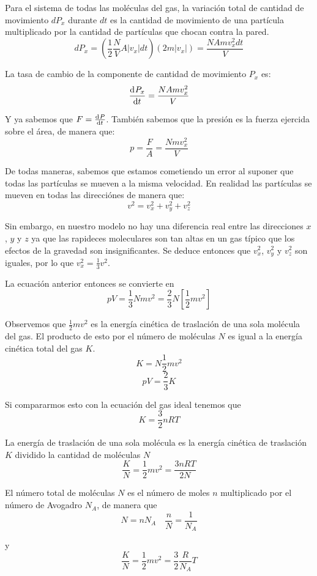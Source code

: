 \documentclass[12pt]{article}
\begin{document}
  Para el sistema de todas las moléculas del gas, la variación total de cantidad de movimiento $ dP_{x} $ durante $ dt $ es la cantidad de movimiento de una partícula multiplicado por la cantidad de partículas que chocan contra la pared.
  \[
  dP_{x} = \left(\frac{1}{2}\frac{N}{V}A\left|v_{x}\right|dt\right)\left(2m\left|v_{x}\right|\right) = \frac{NAmv_{x}^{2}dt}{V}
  \]

  La tasa de cambio de la componente de cantidad de movimiento $ P_{x} $ es:
  \[
  \dv[]{P_{x}}{t} = \frac{NAmv_{x}^{2}}{V}
  \]

  Y ya sabemos que $ F = \dv[]{P}{t} $. También sabemos que la presión es la fuerza ejercida sobre el área, de manera que:
  \[
    p = \frac{F}{A} = \frac{Nmv_{x}^{2}}{V}
  \]

  De todas maneras, sabemos que estamos cometiendo un error al suponer que todas las partículas se mueven a la misma velocidad. En realidad las partículas se mueven en todas las direcciónes de manera que:
  \[
  v^{2} = v_{x}^{2} + v_{y}^{2} + v_{z}^{2}
  \]

  Sin embargo, en nuestro modelo no hay una diferencia real entre las direcciones $ x $, $ y $ y $ z $ ya que las rapideces moleculares son tan altas en un gas típico que los efectos de la gravedad son insignificantes. Se deduce entonces que $ v_{x}^{2} $, $ v_{y}^{2} $ y $ v_{z}^{2} $ son iguales, por lo que $ v_{x}^{2} = \frac{1}{3}v^{2} $.

  La ecuación anterior entonces se convierte en 
  \[
  pV = \frac{1}{3}Nmv^{2} = \frac{2}{3}N\left[\frac{1}{2}mv^{2}\right]
  \]

  Observemos que $ \frac{1}{2}mv^{2} $ es la energía cinética de traslación de una sola molécula del gas. El producto de esto por el número de moléculas $ N $ es igual a la energía cinética total del gas $ K $. 
  \[
  K = N\frac{1}{2}mv^{2}
  \]
  \[
    pV = \frac{2}{3}K
  \]

  Si compararmos esto con la ecuación del gas ideal tenemos que 
  \[
  K = \frac{3}{2}nRT
  \]

  La energía de traslación de una sola molécula es la energía cinética de traslación $ K $ dividido la cantidad de moléculas $ N $
  \[
  \frac{K}{N} = \frac{1}{2}mv^{2} = \frac{3nRT}{2N}
  \]

  El número total de moléculas $ N $ es el número de moles $ n $ multiplicado por el número de Avogadro $ N_{A} $, de manera que
  \[
    N = nN_{A} \quad \frac{n}{N} = \frac{1}{N_{A}}
  \]

  y
  \[
  \frac{K}{N} = \frac{1}{2}mv^{2} = \frac{3}{2}\frac{R}{N_{A}}T
  \]
\end{document}
